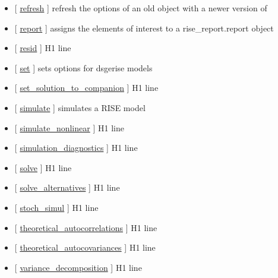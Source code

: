 \documentclass[letterpaper,10pt,english]{sphinxmanual}
\begin{document}
\begin{itemize}
\item {} 
{[} {\hyperref[classes/models/@dsge/dsge:refresh]{refresh}} {]}  refresh the options of an old object with a newer version of

\item {} 
{[} {\hyperref[classes/models/@dsge/dsge:report]{report}} {]} assigns the elements of interest to a rise\_report.report object

\item {} 
{[} {\hyperref[classes/models/@dsge/dsge:resid]{resid}} {]}   H1 line

\item {} 
{[} {\hyperref[classes/models/@dsge/dsge:set]{set}} {]}  sets options for dsge\textbar{}rise models

\item {} 
{[} {\hyperref[classes/models/@dsge/dsge:set-solution-to-companion]{set\_solution\_to\_companion}} {]}   H1 line

\item {} 
{[} {\hyperref[classes/models/@dsge/dsge:simulate]{simulate}} {]}  simulates a RISE model

\item {} 
{[} {\hyperref[classes/models/@dsge/dsge:simulate-nonlinear]{simulate\_nonlinear}} {]}   H1 line

\item {} 
{[} {\hyperref[classes/models/@dsge/dsge:simulation-diagnostics]{simulation\_diagnostics}} {]}   H1 line

\item {} 
{[} {\hyperref[classes/models/@dsge/dsge:solve]{solve}} {]}   H1 line

\item {} 
{[} {\hyperref[classes/models/@dsge/dsge:solve-alternatives]{solve\_alternatives}} {]}   H1 line

\item {} 
{[} {\hyperref[classes/models/@dsge/dsge:stoch-simul]{stoch\_simul}} {]}   H1 line

\item {} 
{[} {\hyperref[classes/models/@dsge/dsge:theoretical-autocorrelations]{theoretical\_autocorrelations}} {]}   H1 line

\item {} 
{[} {\hyperref[classes/models/@dsge/dsge:theoretical-autocovariances]{theoretical\_autocovariances}} {]}   H1 line

\item {} 
{[} {\hyperref[classes/models/@dsge/dsge:variance-decomposition]{variance\_decomposition}} {]}   H1 line

\end{itemize}
\end{document}
